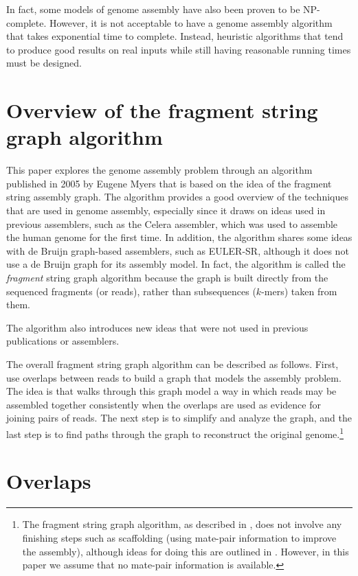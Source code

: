 \documentclass[10pt]{article}
\begin{document}
In fact, some models of genome assembly have also been proven to be
NP-complete\cite{Medvedev2007}.  However, it is not acceptable to have a genome
assembly algorithm that takes exponential time to complete.  Instead, heuristic
algorithms that tend to produce good results on real inputs while still having
reasonable running times must be designed.

\section{Overview of the fragment string graph algorithm}

This paper explores the genome assembly problem through an algorithm published
in 2005 by Eugene Myers that is based on the idea of the fragment string
assembly graph\cite{Myers2005}.  The algorithm provides a good overview of the
techniques that are used in genome assembly, especially since it draws on ideas
used in previous assemblers, such as the Celera assembler, which was used to
assemble the human genome for the first time\cite{Venter2001}.  In addition, the
algorithm shares some ideas with de Bruijn graph-based assemblers, such as
EULER-SR\cite{Pevzner2001}, although it does not use a de Bruijn graph for its
assembly model.  In fact, the algorithm is called the {\em fragment} string
graph algorithm because the graph is built directly from the sequenced fragments
(or reads), rather than subsequences ($k$-mers) taken from them.

The algorithm also introduces new ideas that were not used in previous
publications or assemblers.

The overall fragment string graph algorithm can be described as follows.  First,
use overlaps between reads to build a graph that models the assembly problem.
The idea is that walks through this graph model a way in which reads may be
assembled together consistently when the overlaps are used as evidence for
joining pairs of reads.  The next step is to simplify and analyze the graph, and
the last step is to find paths through the graph to reconstruct the original
genome.\footnote{The fragment string graph algorithm, as described in
\cite{Myers2005}, does not involve any finishing steps such as scaffolding
(using mate-pair information to improve the assembly), although ideas for doing
this are outlined in \cite{Medvedev2009}.  However, in this paper we assume that
no mate-pair information is available.}

\section{Overlaps}
\end{document}

